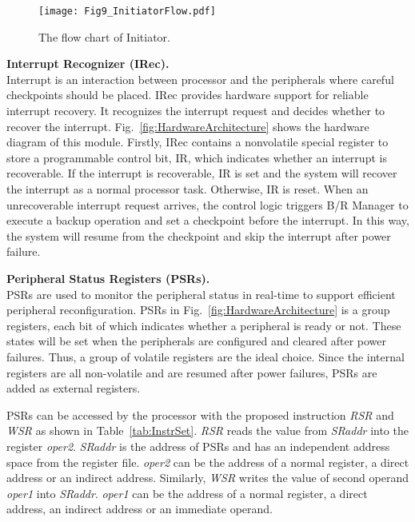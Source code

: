 %
\begin{figure}[t]
    \centering
    \texttt{[image: Fig9\_InitiatorFlow.pdf]}
    \caption{The flow chart of Initiator.}
    \label{fig:InitiatorFlow}
\end{figure}

\noindent\textbf{Interrupt Recognizer (IRec).} \\
%
Interrupt is an interaction between processor and the peripherals where careful checkpoints should be placed.
IRec provides hardware support for reliable interrupt recovery.
It recognizes the interrupt request and decides whether to recover the interrupt.
Fig.~\ref{fig:HardwareArchitecture} shows the hardware diagram of this module.
Firstly, IRec contains a nonvolatile special register to store a programmable control bit, IR, which indicates whether an interrupt is recoverable.
If the interrupt is recoverable, IR is set and the system will recover the interrupt as a normal processor task.
Otherwise, IR is reset.
When an unrecoverable interrupt request arrives, the control logic triggers B/R Manager to execute a backup operation and set a checkpoint before the interrupt.
In this way, the system will resume from the checkpoint and skip the interrupt after power failure.

\noindent\textbf{Peripheral Status Registers {(PSRs)}.} \\
PSRs are used to monitor the peripheral status in real-time to support efficient peripheral reconfiguration.
PSRs in Fig.~\ref{fig:HardwareArchitecture} is a group registers, each bit of which indicates whether a peripheral is ready or not.
These states will be set when the peripherals are configured and cleared after power failures.
Thus, a group of volatile registers are the ideal choice.
Since the internal registers are all non-volatile and are resumed after power failures, PSRs are added as external registers.

PSRs can be accessed by the processor with the proposed instruction \emph{RSR} and \emph{WSR} as shown in Table~\ref{tab:InstrSet}.
\emph{RSR} reads the value from \emph{SRaddr} into the register \emph{oper2}.
\emph{SRaddr} is the address of PSRs and has an independent address space from the register file.
\emph{oper2} can be the address of a normal register, a direct address or an indirect address.
Similarly, \emph{WSR} writes the value of second operand \emph{oper1} into \emph{SRaddr}.
\emph{oper1} can be the address of a normal register, a direct address, an indirect address or an immediate operand.

